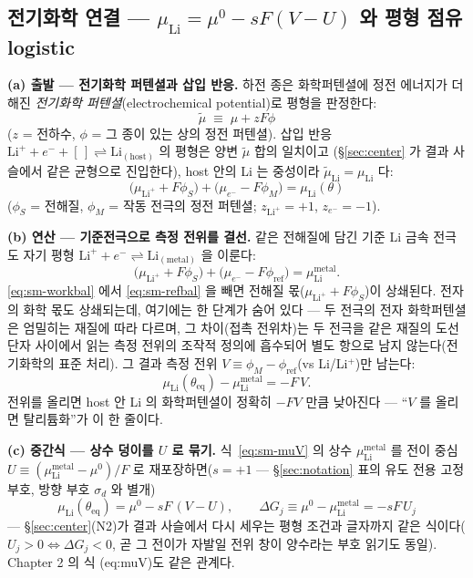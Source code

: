 \documentclass[11pt,a4paper]{article}
\newcommand{\eq}{\mathrm{eq}}
\begin{document}
\subsection{전기화학 연결 --- $\mu_\mathrm{Li}=\mu^0-sF(V-U)$ 와 평형 점유 logistic}\label{sec:sm-electro}
\textbf{(a) 출발 --- 전기화학 퍼텐셜과 삽입 반응.} 하전 종은 화학퍼텐셜에 정전 에너지가 더해진
\emph{전기화학 퍼텐셜}(electrochemical potential)로 평형을 판정한다:
\begin{equation}
\tilde\mu\;\equiv\;\mu+zF\phi
\label{eq:sm-emu}
\end{equation}
($z$ = 전하수, $\phi$ = 그 종이 있는 상의 정전 퍼텐셜). 삽입 반응
$\mathrm{Li}^++e^-+[\,]\rightleftharpoons\mathrm{Li}_{(\mathrm{host})}$ 의 평형은 양변 $\tilde\mu$ 합의 일치이고
(\S\ref{sec:center} 가 결과 사슬에서 같은 균형으로 진입한다), host 안의 Li 는 중성이라
$\tilde\mu_\mathrm{Li}=\mu_\mathrm{Li}$ 다:
\begin{equation}
\big(\mu_{\mathrm{Li}^+}+F\phi_S\big)+\big(\mu_{e^-}-F\phi_M\big)=\mu_\mathrm{Li}(\theta)
\label{eq:sm-workbal}
\end{equation}
($\phi_S$ = 전해질, $\phi_M$ = 작동 전극의 정전 퍼텐셜; $z_{\mathrm{Li}^+}{=}+1$, $z_{e^-}{=}-1$).

\textbf{(b) 연산 --- 기준전극으로 측정 전위를 결선.} 같은 전해질에 담긴 기준 Li 금속 전극도 자기 평형
$\mathrm{Li}^++e^-\rightleftharpoons\mathrm{Li}_{(\mathrm{metal})}$ 을 이룬다:
\begin{equation}
\big(\mu_{\mathrm{Li}^+}+F\phi_S\big)+\big(\mu_{e^-}-F\phi_\mathrm{ref}\big)=\mu_\mathrm{Li}^\mathrm{metal}.
\label{eq:sm-refbal}
\end{equation}
\eqref{eq:sm-workbal} 에서 \eqref{eq:sm-refbal} 을 빼면 전해질 몫($\mu_{\mathrm{Li}^+}+F\phi_S$)이
상쇄된다. 전자의 화학 몫도 상쇄되는데, 여기에는 한 단계가 숨어 있다 — 두 전극의 전자 화학퍼텐셜은
엄밀히는 재질에 따라 다르며, 그 차이(접촉 전위차)는 두 전극을 같은 재질의 도선 단자 사이에서 읽는 측정
전위의 조작적 정의에 흡수되어 별도 항으로 남지 않는다(전기화학의 표준 처리). 그 결과 측정 전위
$V\equiv\phi_M-\phi_\mathrm{ref}$(vs Li/Li$^+$)만 남는다:
\begin{equation}
\mu_\mathrm{Li}(\theta_\eq)-\mu_\mathrm{Li}^\mathrm{metal}=-F\,V.
\label{eq:sm-muV}
\end{equation}
전위를 올리면 host 안 Li 의 화학퍼텐셜이 정확히 $-FV$ 만큼 낮아진다 --- ``$V$ 를 올리면 탈리튬화''가 이 한 줄이다.

\textbf{(c) 중간식 --- 상수 덩이를 $U$ 로 묶기.} 식~\eqref{eq:sm-muV} 의 상수 $\mu_\mathrm{Li}^\mathrm{metal}$
를 전이 중심 $U\equiv(\mu_\mathrm{Li}^\mathrm{metal}-\mu^0)/F$ 로 재포장하면($s=+1$ --- \S\ref{sec:notation}
표의 유도 전용 고정 부호, 방향 부호 $\sigma_d$ 와 별개)
\begin{equation}
\mu_\mathrm{Li}(\theta_\eq)=\mu^0-sF\,(V-U),
\qquad
\Delta G_j\equiv\mu^0-\mu_\mathrm{Li}^\mathrm{metal}=-sF\,U_j
\label{eq:sm-eqcond}
\end{equation}
--- \S\ref{sec:center}(N2)가 결과 사슬에서 다시 세우는 평형 조건과 글자까지 같은 식이다($U_j>0
\Leftrightarrow\Delta G_j<0$, 곧 그 전이가 자발일 전위 창이 양수라는 부호 읽기도 동일). Chapter 2 의 식
(eq:muV)도 같은 관계다.
\end{document}
